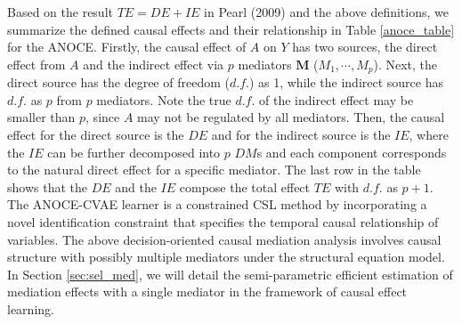 Based on the result $TE = DE+ IE$ in Pearl (2009) and the above definitions, we summarize the defined causal effects and their relationship in Table \ref{anoce_table} for the \acrfull{ANOCE}. Firstly, the causal effect of $A$ on $Y$ has two sources, the direct effect from $A$ and the indirect effect via $p$ mediators $\mathbf{M}$ ($M_1,\cdots, M_p$). Next, the direct source has the degree of freedom ($d.f.$) as 1, while the indirect source has $d.f.$ as $p$ from $p$ mediators. Note the true $d.f.$ of the indirect effect may be smaller than $p$, since $A$ may not be regulated by all mediators. Then, the causal effect for the direct source is the $DE$ and for the indirect source is the $IE$, where the $IE$ can be further decomposed into $p$ $DM$s and each component corresponds to the natural direct effect for a specific mediator. The last row in the table shows that the $DE$ and the $IE$ compose the total effect $TE$ with $d.f.$ as $p+1$. 
The ANOCE-CVAE learner \citep{cai2020anoce} is a constrained \acrshort{CSL} method by incorporating a novel identification constraint that specifies the temporal causal relationship of variables. The above decision-oriented causal mediation analysis involves causal structure with possibly multiple mediators under the structural equation model. In Section \ref{sec:sel_med}, we will detail the semi-parametric efficient estimation of mediation effects with a single mediator in the framework of causal effect learning.

